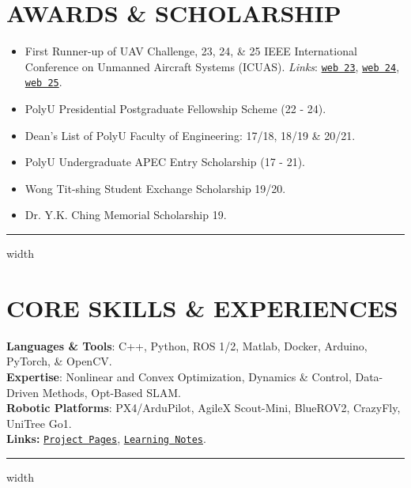 \documentclass[overlapped]{res}
\newcommand{\pink}[1]{\textcolor{pink!40!red}{#1}} %
\begin{document}
\begin{resume}
\section{AWARDS \& SCHOLARSHIP}
\begin{itemize}
  \item First Runner-up of UAV Challenge, \textquotesingle{}23, \textquotesingle{}24, \& \textquotesingle{}25 IEEE International Conference on Unmanned Aircraft Systems (ICUAS). \textit{Links}: \pink{
    \texttt{\href{https://www.polyu.edu.hk/publications/pulse-polyu/issue/202308/achievements/aae-team-wins-first-runner-up-prize-at-icuas-23-uav-competition}{web \textquotesingle{}23}}},
    \pink{
    \texttt{\href{https://www.polyu.edu.hk/aae/news-and-events/news/2024/jun-20_icuas-2024-first-runner-up/}{web \textquotesingle{}24}}},
    \pink{
    \texttt{\href{https://www.polyu.edu.hk/aae/news-and-events/news/2025/20250702_icuas2025/?sc_lang=en}{web \textquotesingle{}25}}}.
  \item PolyU Presidential Postgraduate Fellowship Scheme (\textquotesingle{}22 - \textquotesingle{}24).
  \item Dean’s List of PolyU Faculty of Engineering: \textquotesingle{}17/18, \textquotesingle{}18/19 \& \textquotesingle{}20/21.
  \item PolyU Undergraduate APEC Entry Scholarship (\textquotesingle{}17 - \textquotesingle{}21).
  \item Wong Tit-shing Student Exchange Scholarship \textquotesingle{}19/20.
  \item Dr. Y.K. Ching Memorial Scholarship \textquotesingle{}19.
\end{itemize}
\par\noindent\hrule width \linewidth %
\section{CORE SKILLS \& EXPERIENCES}
\textbf{Languages \& Tools}: C++, Python, ROS 1/2, Matlab, Docker, Arduino, PyTorch, \& OpenCV.\\
\textbf{Expertise}: Nonlinear and Convex Optimization, Dynamics \& Control, Data-Driven Methods, Opt-Based SLAM. \\
\textbf{Robotic Platforms}: PX4/ArduPilot, AgileX Scout-Mini, BlueROV2, CrazyFly, UniTree Go1. \\
\textbf{Links:} \pink{{\texttt{\href{https://pattylo.github.io/\#project}{Project Pages}}}}, \pink{{\texttt{\href{https://github.com/pattylo/learning_jungle}{Learning Notes}}}}.
\par\noindent\hrule width \linewidth %

\end{resume}
\end{document}
